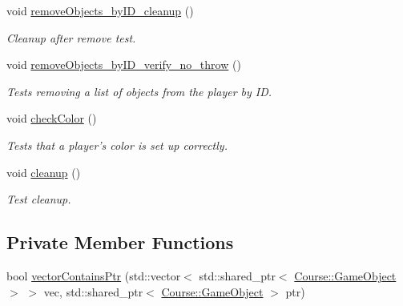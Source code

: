 \begin{DoxyCompactItemize}
void \hyperlink{classdefault__player_a4c613b5255994d71ed2343ebdabf4646}{remove\-Objects\-\_\-by\-I\-D\-\_\-cleanup} ()
\begin{DoxyCompactList}\small\item\em Cleanup after remove test. \end{DoxyCompactList}\item 
void \hyperlink{classdefault__player_a37dab33c8c4002f7004b4c9fdcd85e8b}{remove\-Objects\-\_\-by\-I\-D\-\_\-verify\-\_\-no\-\_\-throw} ()
\begin{DoxyCompactList}\small\item\em Tests removing a list of objects from the player by I\-D. \end{DoxyCompactList}\item 
void \hyperlink{classdefault__player_a4bb03f35364f0bf7843fb10095828eeb}{check\-Color} ()
\begin{DoxyCompactList}\small\item\em Tests that a player's color is set up correctly. \end{DoxyCompactList}\item 
void \hyperlink{classdefault__player_aeb1b52f587a7f1593c05783f86eb7b79}{cleanup} ()
\begin{DoxyCompactList}\small\item\em Test cleanup. \end{DoxyCompactList}\end{DoxyCompactItemize}
\subsection*{Private Member Functions}
\begin{DoxyCompactItemize}
\item 
bool \hyperlink{classdefault__player_abc1e0d2a87aa8f8ee30b4ab253b13f31}{vector\-Contains\-Ptr} (std\-::vector$<$ std\-::shared\-\_\-ptr$<$ \hyperlink{classCourse_1_1GameObject}{Course\-::\-Game\-Object} $>$ $>$ vec, std\-::shared\-\_\-ptr$<$ \hyperlink{classCourse_1_1GameObject}{Course\-::\-Game\-Object} $>$ ptr)
\end{DoxyCompactItemize}
